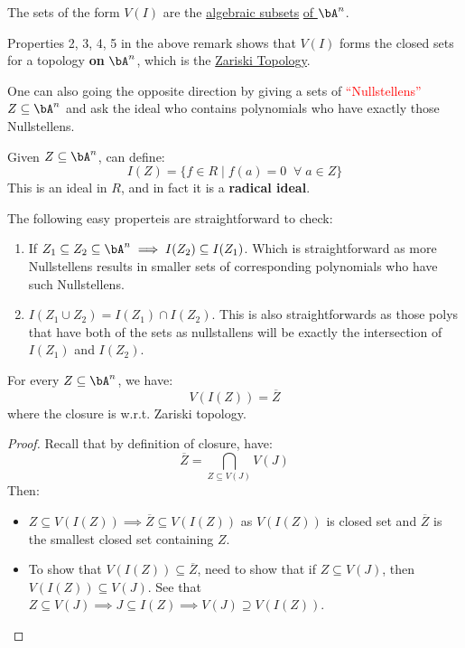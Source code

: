 \begin{definition}
	The sets of the form \( V(I) \) are the \underline{algebraic subsets} \underline{of \( \bA^n \)}.
\end{definition}

\begin{definition}
	Properties 2, 3, 4, 5 in the above remark shows that \( V(I) \) forms the closed sets for a
	topology \textbf{on} \( \bA^n \), which is the \underline{Zariski Topology}.
\end{definition}
One can also going the opposite direction by giving a sets of \textcolor{red}{``Nullstellens''} \( Z
\subseteq \bA^n \) and ask the ideal who contains polynomials who have exactly those Nullstellens.

\begin{definition}
	Given \( Z \subseteq \bA^n \), can define:
	\[
		I(Z) = \{f \in R \; | \; f(a) = 0 \; \; \forall \; a \in Z\}
	\]
	This is an ideal in \( R \), and in fact it is a \textbf{radical ideal}.
\end{definition}
The following easy properteis are straightforward to check:

\begin{remark}
	\leavevmode
	\begin{enumerate}
		\item If \( Z_1 \subseteq Z_2 \subseteq \bA^n  \implies I(Z_2) \subseteq I(Z_1)\). Which is
		      straightforward as more Nullstellens results in smaller sets of corresponding polynomials
		      who have such Nullstellens.
		\item \( I(Z_1 \cup Z_2) = I(Z_1) \cap I(Z_2) \). This is also straightforwards as those polys
		      that have both of the sets as nullstallens will be exactly the intersection of \( I(Z_1) \)
		      and \( I(Z_2) \).
	\end{enumerate}
\end{remark}

\begin{proposition}
	\label{prop:closure-of-Z-is-V(I(Z))}
	For every \( Z \subseteq \bA^n \), we have:
	\[
		V(I(Z)) = \overline{Z}
	\]
	where the closure is w.r.t. Zariski topology.
\end{proposition}

\begin{proof}
	Recall that by definition of closure, have:
	\[
		\overline{Z} = \bigcap_{Z \subseteq V(J)} V(J)
	\]
	Then:
	\begin{itemize}
		\item \( Z \subseteq V(I(Z)) \implies \overline{Z} \subseteq V(I(Z))\) as \( V(I(Z)) \) is
		      closed set and \( \overline{Z} \) is the smallest closed set containing \( Z \).
		\item To show that \( V(I(Z)) \subseteq \overline{Z} \), need to show that if \( Z\subseteq
		      V(J) \), then \( V(I(Z)) \subseteq V(J) \). See that \( Z \subseteq V(J) \implies J
		      \subseteq I(Z) \implies  V(J) \supseteq V(I(Z)) \).
	\end{itemize}
\end{proof}

